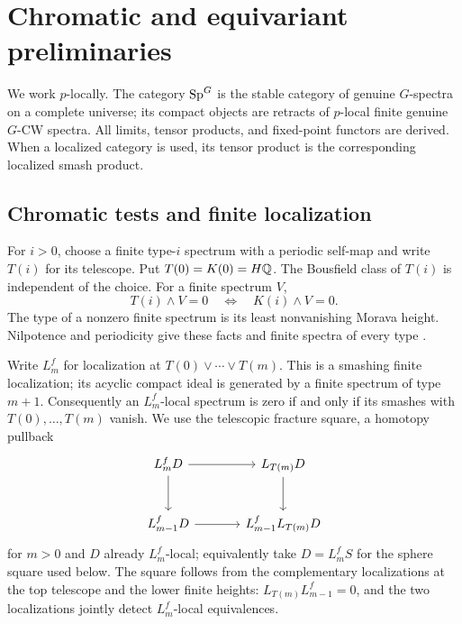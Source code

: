 \section{Chromatic and equivariant preliminaries}\label{sec:background}

We work \(p\)-locally. The category \(\mathrm{Sp}^G\) is the stable category of genuine \(G\)-spectra on a complete universe; its compact objects are retracts of \(p\)-local finite genuine \(G\)-CW spectra. All limits, tensor products, and fixed-point functors are derived. When a localized category is used, its tensor product is the corresponding localized smash product.

\subsection{Chromatic tests and finite localization}

For \(i>0\), choose a finite type-\(i\) spectrum with a periodic self-map and write \(T(i)\) for its telescope. Put \(T(0)=K(0)=H\mathbb Q\). The Bousfield class of \(T(i)\) is independent of the choice. For a finite spectrum \(V\),
\begin{equation}\label{eq:finite-tests}
 T(i)\wedge V=0\quad\Longleftrightarrow\quad K(i)\wedge V=0.
\end{equation}
The type of a nonzero finite spectrum is its least nonvanishing Morava height. Nilpotence and periodicity give these facts and finite spectra of every type \cite{HS}.

Write \(L_m^f\) for localization at \(T(0)\vee\cdots\vee T(m)\). This is a smashing finite localization; its acyclic compact ideal is generated by a finite spectrum of type \(m+1\). Consequently an \(L_m^f\)-local spectrum is zero if and only if its smashes with \(T(0),\ldots,T(m)\) vanish. We use the telescopic fracture square, a homotopy pullback
\begin{equation}\label{eq:fracture}
\begin{tikzcd}[column sep=large,row sep=large]
 L_m^fD \arrow[r]\arrow[d]&L_{T(m)}D\arrow[d]\\
 L_{m-1}^fD\arrow[r]&L_{m-1}^fL_{T(m)}D
\end{tikzcd}
\end{equation}
for \(m>0\) and \(D\) already \(L_m^f\)-local; equivalently take \(D=L_m^fS\) for the sphere square used below. The square follows from the complementary localizations at the top telescope and the lower finite heights: \(L_{T(m)}L_{m-1}^f=0\), and the two localizations jointly detect \(L_m^f\)-local equivalences.

